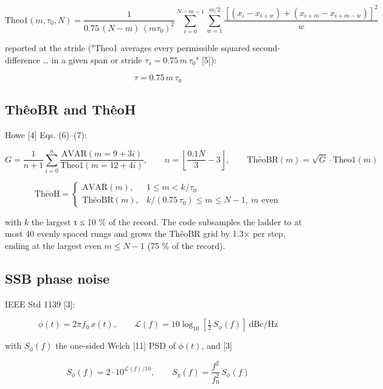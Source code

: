 \documentclass[10pt,a4paper]{article}
\begin{document}
\[
\mathrm{Theo1}(m,\tau_0,N) = \frac{1}{0.75\,(N-m)\,(m\tau_0)^2}
\sum_{i=0}^{N-m-1}\sum_{w=1}^{m/2}
\frac{\left[(x_i - x_{i+w}) + (x_{i+m} - x_{i+m-w})\right]^2}{w}
\]

reported at the stride ("Theo1 averages every permissible squared
second-difference \ldots{} in a given span or stride \(\tau_s = 0.75\,m\,\tau_0\)" {[}5{]}):

\[
\tau = 0.75\, m\, \tau_0
\]


\hypertarget{thuxeaobr-and-thuxeaoh}{%
\subsection{ThêoBR and ThêoH}\label{thuxeaobr-and-thuxeaoh}}

Howe {[}4{]} Eqs. (6)--(7):

\[
G = \frac{1}{n+1}\sum_{i=0}^{n}
\frac{\mathrm{AVAR}(m = 9+3i)}{\mathrm{Theo1}(m = 12+4i)},\qquad
n = \left\lfloor \frac{0.1N}{3} - 3 \right\rfloor,\qquad
\mathrm{Th\hat{e}oBR}(m) = \sqrt{G}\cdot\mathrm{Theo1}(m)
\]

\[
\mathrm{Th\hat{e}oH} =
\begin{cases}
\mathrm{AVAR}(m), & 1 \le m < k/\tau_0 \\
\mathrm{Th\hat{e}oBR}(m), & k/(0.75\,\tau_0) \le m \le N-1,\ m \text{ even}
\end{cases}
\]

with \(k\) the largest τ ≤ 10 \% of the record. The code subsamples the ladder
to at most 40 evenly spaced rungs and grows the ThêoBR grid by 1.3× per step,
ending at the largest even \(m \le N-1\) (75 \% of the record).


\hypertarget{ssb-phase-noise}{%
\subsection{SSB phase noise}\label{ssb-phase-noise}}

IEEE Std 1139 {[}3{]}:

\[
\phi(t) = 2\pi f_0\, x(t), \qquad
\mathcal{L}(f) = 10\log_{10}\!\left[\tfrac{1}{2}\,S_\phi(f)\right]\ \mathrm{dBc/Hz}
\]

with \(S_\phi(f)\) the one-sided Welch {[}11{]} PSD of \(\phi(t)\), and {[}3{]}

\[
S_\phi(f) = 2\cdot 10^{\mathcal{L}(f)/10}, \qquad
S_y(f) = \frac{f^2}{f_0^2}\, S_\phi(f)
\]
\end{document}
